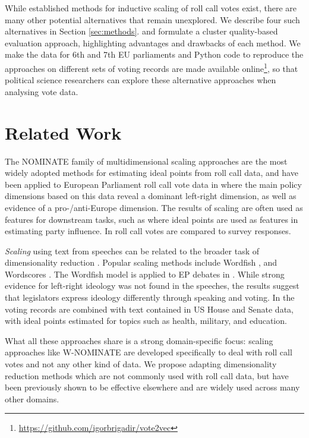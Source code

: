 \documentclass{llncs}
\begin{document}
While established methods for inductive scaling of roll call votes exist, there are many other potential alternatives that remain unexplored. We describe four such alternatives in Section \ref{sec:methods}. and formulate a cluster quality-based evaluation approach, highlighting advantages and drawbacks of each method. We make the data for 6th and 7th EU parliaments and Python code to reproduce the approaches on different sets of voting records are made available online\footnote{\url{https://github.com/igorbrigadir/vote2vec}}, so that political science researchers can explore these alternative approaches when analysing vote data.

\section{Related Work}
\label{sec:relatedwork}

The NOMINATE \cite{poole2000congress} family of multidimensional scaling approaches are the most widely adopted methods for estimating ideal points from roll call data, and have been applied to European Parliament roll call vote data in \cite{hix2006dim} where the main policy dimensions based on this data reveal a dominant left-right dimension, as well as evidence of a pro-/anti-Europe dimension.
The results of scaling are often used as features for downstream tasks, such as \cite{mcelroy2012policy} where ideal points are used as features in estimating party influence. In \cite{gabel2007preferences} roll call votes are compared to survey responses.

\emph{Scaling} using text from speeches \cite{proksch2010position} can be related to the broader task of dimensionality reduction \cite{lowe2013there}. Popular scaling methods include Wordfish \cite{wordfish}, and Wordscores \cite{wordscores2003}. The Wordfish model is applied to EP debates in \cite{proksch2010position}. While strong evidence for left-right ideology was not found in the speeches, the results suggest that legislators express ideology differently through speaking and voting. In \cite{GuTF} the voting records are combined with text contained in US House and Senate data, with ideal points estimated for topics such as health, military, and education.

What all these approaches share is a strong domain-specific focus: scaling approaches like W-NOMINATE\cite{wnominate} are developed specifically to deal with roll call votes and not any other kind of data. We propose adapting dimensionality reduction methods which are not commonly used with roll call data, but have been previously shown to be effective elsewhere and are widely used across many other domains.
\end{document}
